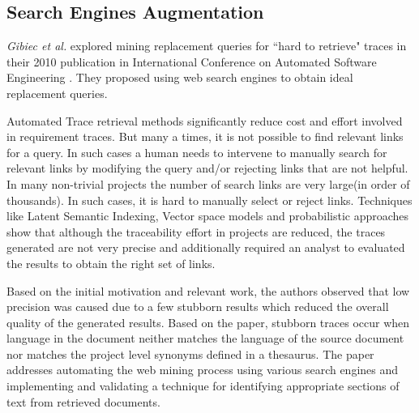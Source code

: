 \documentclass{report}
\begin{document}
\subsection{Search Engines Augmentation}
\label{sec:SEAugment}
\textit{Gibiec et al.} explored mining replacement queries for ``hard to retrieve" traces in their
2010 publication in International Conference on Automated Software Engineering \cite{gibiec10}. They 
proposed using web search engines to obtain ideal replacement queries.

Automated Trace retrieval methods significantly reduce cost and effort involved in requirement traces. 
But many a times, it is not possible to find relevant links for a query. In such cases a human needs to
intervene to manually search for relevant links by modifying the query and/or rejecting links that are not
helpful. In many non-trivial projects the number of search links are very large(in order of thousands). In
such cases, it is hard to manually select or reject links. Techniques like Latent Semantic Indexing,
Vector space models and probabilistic approaches show that although the traceability effort in projects
are reduced, the traces generated are not very precise and additionally required an analyst to evaluated
the results to obtain the right set of links.

Based on the initial motivation and relevant work, the authors observed that low precision was caused due to a few stubborn results which reduced the overall quality of the generated results. Based on the paper,
stubborn traces occur when language in the document neither matches the language of the source document
nor matches the project level synonyms defined in a thesaurus. The paper addresses automating the web
mining process using various search engines and implementing and validating a technique for identifying
appropriate sections of text from retrieved documents.
\end{document}
